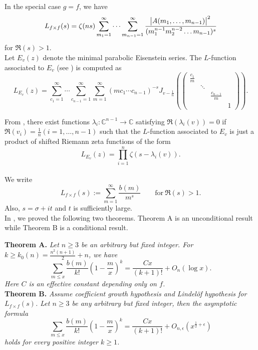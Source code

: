 \documentclass[sn-mathphys,Numbered]{sn-jnl}
\theoremstyle{thmstyleone}%
\theoremstyle{thmstyletwo}%
\theoremstyle{thmstylethree}%
\begin{document}
\noindent
In the special case $g=f$, we have
$$ L_{f\times f}(s) = \zeta(ns) \sum_{m_1=1}^{\infty} \dots \sum_{m_{n-1}=1}^{\infty} \frac{\abs{A(m_1,\dots,m_{n-1})}^2}{(m_1^{n-1} m_2^{n-2} \dots m_{n-1})^s}$$ 
for $\Re(s) > 1$. \\

\noindent
Let $E_v(z)$ denote the minimal parabolic Eisenstein series. The $L$-function associated to $E_v$ (see \cite[Equation (10.8.5)]{Dg}) is computed as
$$ L_{E_v}(z)= \sum_{c_1=1}^{\infty} \cdots \sum_{c_{n-1}=1}^{\infty} \sum_{m=1}^{\infty} (m c_1 \cdots c_{n-1})^{-s} J_{v-\frac{1}{n}} \left( 
\begin{pmatrix}
\frac{c_1}{m} &          &                          & \\
                    & \ddots &                          & \\
                    &          & \frac{c_{n-1}}{m} & \\
                    &          &                           & 1 
\end{pmatrix} 
\right) . $$

\noindent
From \cite[Theorem 10.8.6]{Dg}, there exist functions $\lambda_i: \mathbb{C}^{n-1} \to \mathbb{C}$ satisfying $ \Re \left( \lambda_i(v) \right) =0$ if $\Re(v_i) =\frac{1}{n} (i=1,\dots,n-1)$ such that the $L$-function associated to $E_v$ is just a product of shifted Riemann zeta functions of the form 
$$ L_{E_v}(z) = \prod_{i=1}^n \zeta \left( s-\lambda_i(v) \right) .$$ \\





\noindent
We write 
$$ L_{f \times f}(s) := \sum_{m=1}^{\infty} \frac{b(m)}{m^s} \qquad \text{for} \ \Re(s) > 1.$$ 
Also, $s=\sigma+it$ and $t$ is sufficiently large. \\





In \cite{AkAs}, we proved the following two theorems. Theorem A is an unconditional result while Theorem B is a conditional result.

{\bf Theorem A.} 
\emph{
Let $n \geq 3$ be an arbitrary but fixed integer.  For $k \geq k_0(n) = \frac{n^2(n+1)}{2} +n$, we have 
$$ \sum_{m \leq x} \frac{b(m)}{k!} \left( 1-\frac{m}{x} \right)^k = \frac{Cx}{(k+1)!} + O_{n} (\log x) .$$
Here $C$ is an effective constant depending only on $f$. } \\


{\bf Theorem B.}
\emph{
Assume coefficient growth hypothesis and Lindel\"{o}f hypothesis for $L_{f \times f}(s)$. Let $n \geq 3$ be any arbitrary but fixed integer, then the asymptotic formula
$$ \sum_{m \leq x} \frac{b(m)}{k!} \left( 1-\frac{m}{x} \right)^k  = \frac{Cx}{(k+1)!} + O_{n,\epsilon}(x^{\frac{1}{2}+\epsilon})$$
holds for every positive integer $k \geq 1$. } \\
\end{document}
